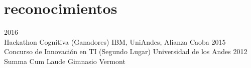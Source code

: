 \documentclass[espanol]{cv-style}          %
\begin{document}
\section{reconocimientos}
\begin{entrylist}
\entry
{2016\\\vspace{-0.3cm}}
{Hackathon Cognitiva (Ganadores)}
{IBM, UniAndes, Alianza Caoba}
{\vspace{-0.3cm}}
\entry
{2015\\\vspace{-0.3cm}}
{Concurso de Innovación en TI (Segundo Lugar)}
{Universidad de los Andes}
{\vspace{-0.3cm}}
\entry
{2012\\\vspace{-0.5cm}}
{Summa Cum Laude}
{Gimnasio Vermont}
{\vspace{-0.5cm}}
\end{entrylist}
\end{document}
